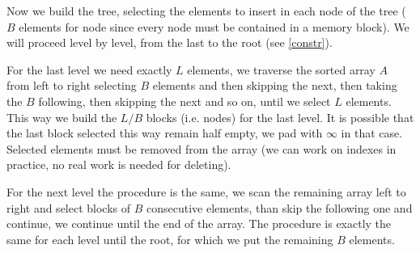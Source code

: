 \documentclass[a4paper]{article}
\begin{document}
Now we build the tree, selecting the elements to insert in each node of the tree ($B$ elements for node since every node must be contained in a memory block).
We will proceed level by level, from the last to the root (see \ref{constr}).

For the last level we need exactly $L$ elements, we traverse the sorted array $A$ from left to right selecting $B$ elements and then skipping the next, then taking the $B$ following, then skipping the next and so on, until we select $L$ elements.
This way we build the $L/B$ blocks (i.e. nodes) for the last level.
It is possible that the last block selected this way remain half empty, we pad with $\infty$ in that case.
Selected elements must be removed from the array (we can work on indexes in practice, no real work is needed for deleting).

For the next level the procedure is the same, we scan the remaining array left to right and select blocks of $B$ consecutive elements, than skip the following one and continue, we continue until the end of the array.
The procedure is exactly the same for each level until the root, for which we put the remaining $B$ elements.
\end{document}
